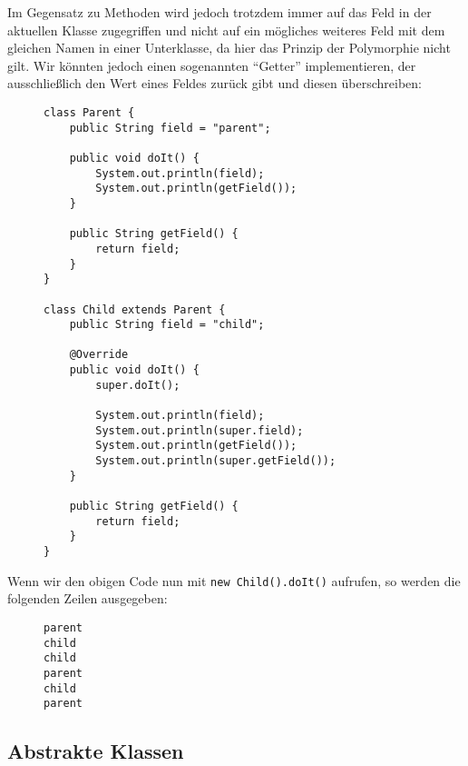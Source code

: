 		Im Gegensatz zu Methoden wird jedoch trotzdem immer auf das Feld in der aktuellen Klasse zugegriffen und nicht auf ein mögliches weiteres Feld mit dem gleichen Namen in einer Unterklasse, da hier das Prinzip der Polymorphie nicht gilt. Wir könnten jedoch einen sogenannten \enquote{Getter} implementieren, der ausschließlich den Wert eines Feldes zurück gibt und diesen überschreiben:
		\begin{figure}[H]
			\centering
			\begin{lstlisting}
class Parent {
	public String field = "parent";

	public void doIt() {
		System.out.println(field);
		System.out.println(getField());
	}

	public String getField() {
		return field;
	}
}

class Child extends Parent {
	public String field = "child";

	@Override
	public void doIt() {
		super.doIt();

		System.out.println(field);
		System.out.println(super.field);
		System.out.println(getField());
		System.out.println(super.getField());
	}

	public String getField() {
		return field;
	}
}
\end{lstlisting}
		\end{figure}
		Wenn wir den obigen Code nun mit \lstinline|new Child().doIt()| aufrufen, so werden die folgenden Zeilen ausgegeben:
		\begin{figure}[H]
			\centering
			\begin{verbatim}
parent
child
child
parent
child
parent
\end{verbatim}
		\end{figure}

\subsection{Abstrakte Klassen}
	
